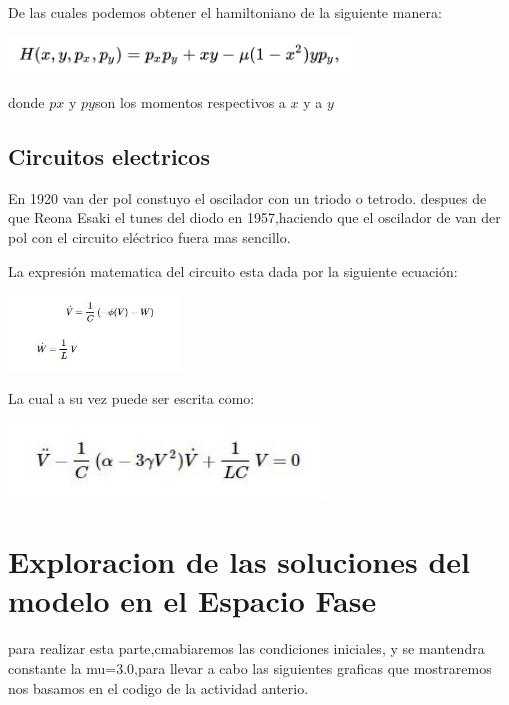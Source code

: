 \documentclass{article}
\begin{document}
De las cuales podemos obtener el hamiltoniano de la siguiente manera:


\begin{center}
\includegraphics[height=1cm]{fig7.png}
\end{center}


donde $px$ y $py$son los momentos respectivos a $x$ y a $y$


\subsection{Circuitos electricos}

En 1920 van der pol constuyo el oscilador con un triodo o tetrodo. despues de que Reona Esaki el tunes del diodo en 1957,haciendo que el oscilador de van der pol con el circuito eléctrico fuera mas sencillo.

La expresión matematica del circuito esta dada por la siguiente ecuación:

\begin{center}
\includegraphics[height=2cm]{fig10.png}
\end{center}

La cual a su vez puede ser escrita como:

\begin{center}
\includegraphics[height=2cm]{fig11.png}
\end{center}

\section{Exploracion de las soluciones del modelo en el Espacio Fase}

para realizar esta parte,cmabiaremos las condiciones iniciales, y se mantendra constante la mu=3.0,para llevar a cabo las siguientes graficas que mostraremos nos basamos en el codigo de la actividad anterio.
\end{document}
